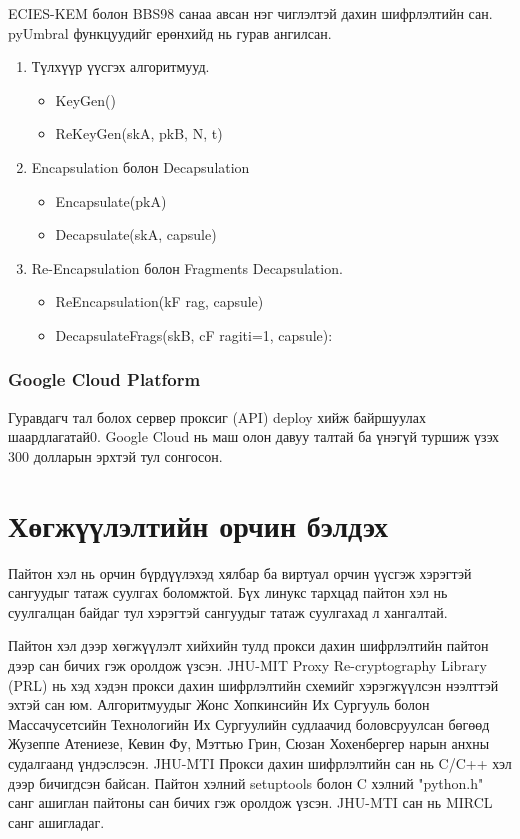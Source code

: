 ECIES-KEM болон BBS98 санаа авсан нэг чиглэлтэй дахин шифрлэлтийн сан. pyUmbral функцуудийг ерөнхийд нь гурав ангилсан.
\begin{enumerate}
    \item Түлхүүр үүсгэх алгоритмууд.
    \begin{itemize}
        \item KeyGen()
        \item ReKeyGen(skA, pkB, N, t)
    \end{itemize}
    \item Encapsulation болон Decapsulation
    \begin{itemize}
        \item Encapsulate(pkA)
        \item Decapsulate(skA, capsule)
    \end{itemize}
    \item Re-Encapsulation болон Fragments Decapsulation.
    \begin{itemize}
        \item ReEncapsulation(kF rag, capsule)
        \item DecapsulateFrags(skB, {cF ragi}ti=1, capsule):
    \end{itemize}
\end{enumerate}

\subsubsection*{\textbf{Google Cloud Platform}}
Гуравдагч тал болох сервер проксиг (API) deploy хийж байршуулах шаардлагатай0. Google Cloud нь маш олон давуу талтай ба үнэгүй туршиж үзэх 300 долларын эрхтэй тул сонгосон.

\section{Хөгжүүлэлтийн орчин бэлдэх}
Пайтон хэл нь орчин бүрдүүлэхэд хялбар ба виртуал орчин үүсгэж хэрэгтэй сангуудыг татаж суулгах боломжтой. Бүх линукс тархцад пайтон хэл нь суулгалцан байдаг тул хэрэгтэй сангуудыг татаж суулгахад л хангалтай. 

Пайтон хэл дээр хөгжүүлэлт хийхийн тулд прокси дахин шифрлэлтийн пайтон дээр сан бичих гэж оролдож үзсэн.
JHU-MIT Proxy Re-cryptography Library (PRL) нь хэд хэдэн прокси дахин шифрлэлтийн схемийг хэрэгжүүлсэн нээлттэй эхтэй сан юм. Алгоритмуудыг Жонс Хопкинсийн Их Сургууль болон Массачусетсийн Технологийн Их Сургуулийн судлаачид боловсруулсан бөгөөд Жузеппе Атениезе, Кевин Фу, Мэттью Грин, Сюзан Хохенбергер нарын анхны судалгаанд үндэслэсэн. 
JHU-MTI Прокси дахин шифрлэлтийн сан нь C/C++ хэл дээр бичигдсэн байсан. Пайтон хэлний setuptools болон C хэлний "python.h" санг ашиглан пайтоны сан бичих гэж оролдож үзсэн. JHU-MTI сан нь MIRCL санг ашигладаг.

